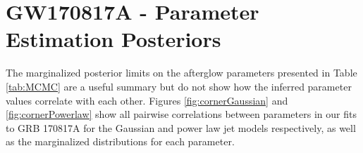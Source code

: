 \documentclass[twocolumn]{aastex62}
\newcommand{\grbbns}{GRB 170817A}
\newcommand{\epse}{\ensuremath{\varepsilon_{\mathrm{e}}}}
\newcommand{\epsB}{\ensuremath{\varepsilon_{\mathrm{B}}}}
\newcommand{\som}{\ensuremath{s_{\Omega}}}
\begin{document}
%

\section{GW170817A - Parameter Estimation Posteriors}\label{sec:corners}

The marginalized posterior limits on the afterglow parameters presented in Table \ref{tab:MCMC} are a useful summary but do not show how the inferred parameter values correlate with each other.  Figures \ref{fig:cornerGaussian} and \ref{fig:cornerPowerlaw} show all pairwise correlations between parameters in our fits to \grbbns{} for the Gaussian and power law jet models respectively, as well as the marginalized distributions for each parameter.
\end{document}
